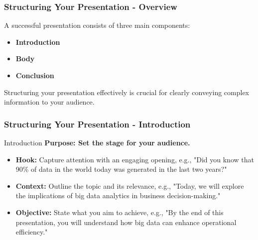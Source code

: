\documentclass[aspectratio=169]{beamer}
\begin{document}
\begin{frame}[fragile]
  \frametitle{Structuring Your Presentation - Overview}
  
  A successful presentation consists of three main components:
  \begin{itemize}
    \item \textbf{Introduction}
    \item \textbf{Body}
    \item \textbf{Conclusion}
  \end{itemize}
  
  Structuring your presentation effectively is crucial for clearly conveying complex information to your audience.
\end{frame}

\begin{frame}[fragile]
  \frametitle{Structuring Your Presentation - Introduction}
  
  \begin{block}{Introduction}
    \textbf{Purpose: Set the stage for your audience.}
  \end{block}
  
  \begin{itemize}
    \item \textbf{Hook:} Capture attention with an engaging opening, e.g., "Did you know that 90\% of data in the world today was generated in the last two years?"
    \item \textbf{Context:} Outline the topic and its relevance, e.g., "Today, we will explore the implications of big data analytics in business decision-making."
    \item \textbf{Objective:} State what you aim to achieve, e.g., "By the end of this presentation, you will understand how big data can enhance operational efficiency."
  \end{itemize}
\end{frame}
\end{document}
